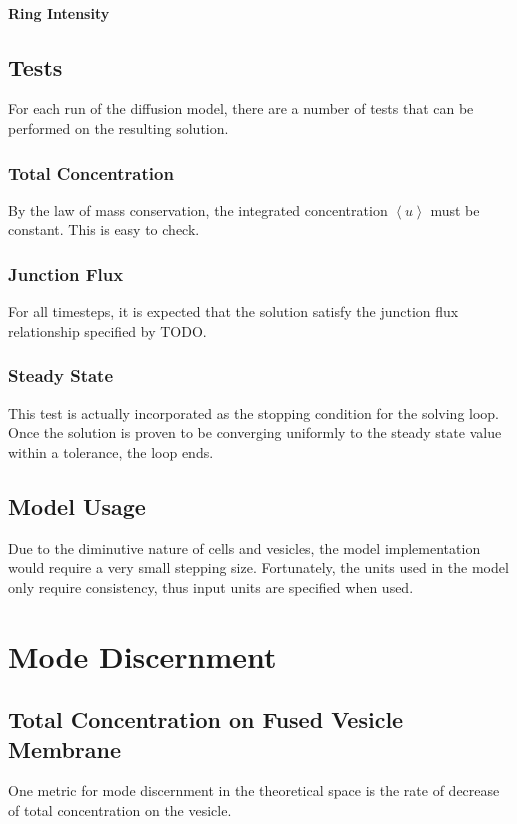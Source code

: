 \documentclass{report}
\newcommand\Angle[1]{{ \left\langle{#1}\right\rangle }}
\begin{document}
\subsection{Ring Intensity}

\chapter{Tests}
For each run of the diffusion model, there are a number of tests that can be performed on the resulting solution.

\section{Total Concentration}
By the law of mass conservation, the integrated concentration $\Angle{u}$ must be constant. This is easy to check.

\section{Junction Flux}
For all timesteps, it is expected that the solution satisfy the junction flux relationship specified by TODO.

\section{Steady State}
This test is actually incorporated as the stopping condition for the solving loop. Once the solution is proven to be converging uniformly to the steady state value within a tolerance, the loop ends.

\chapter{Model Usage}
Due to the diminutive nature of cells and vesicles, the model implementation would require a very small stepping size. Fortunately, the units used in the model only require consistency, thus input units are specified when used.

\part{Mode Discernment}
\chapter{Total Concentration on Fused Vesicle Membrane}
One metric for mode discernment in the theoretical space is the rate of decrease of total concentration on the vesicle.
\end{document}
